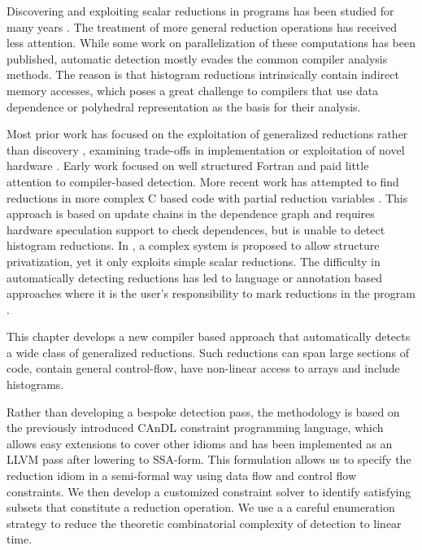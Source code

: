    Discovering and exploiting scalar reductions in programs has been
    studied for many years \cite{pottenger1995idiom}.
    The treatment of more general reduction operations has received less
    attention.
    While some work on parallelization of these computations has been published,
    automatic detection mostly evades the common compiler analysis methods.
    The reason is that histogram reductions intrinsically contain indirect
    memory accesses, which poses a great challenge to compilers that use
    data dependence \cite{kuck1981dependence} or polyhedral
    representation \cite{ benabderrahmane2010polyhedral} as the basis for
    their analysis.

    Most prior work has focused on the exploitation of generalized reductions
    rather than discovery \cite{Gutierrez:2000}, examining trade-offs in
    implementation \cite{yu2006adaptive} or exploitation of novel hardware
    \cite{Huo2011HiPC}.
    Early work focused on well structured Fortran and paid little attention to
    compiler-based detection.  More recent work has attempted to find
    reductions in more complex C based code with partial reduction
    variables \cite{Han2010Speculative}. This approach is  based on update
    chains in the dependence graph and requires hardware speculation support
    to check dependences, but is unable to detect histogram
    reductions. In \cite{Johnson:2012:SSP:2254064.2254107}, a complex system is
    proposed to allow structure privatization, yet it only exploits simple
    scalar reductions.  The difficulty in automatically detecting
    reductions has led to language or annotation based approaches where it
    is the user's responsibility to mark reductions in the
    program \cite{Reddy2016Reduction,ciesko2015scaling}.

    This chapter develops a new compiler based approach that
    automatically detects a wide class of generalized reductions. Such
    reductions can span large sections of code, contain general
    control-flow, have non-linear access to arrays and include histograms.

    Rather than developing a bespoke detection pass, the methodology is based on
    the previously introduced CAnDL constraint programming language, which
    allows easy extensions to cover other idioms and has been implemented as an
    LLVM \cite{lattner2004llvm} pass after lowering to SSA-form.  
    This formulation allows us to specify the reduction idiom in a semi-formal
    way using data flow and control flow constraints.
    We then develop a customized constraint solver to identify
    satisfying subsets that constitute a reduction operation.  We use a a careful
    enumeration strategy to reduce the theoretic combinatorial complexity
    of detection to  linear time.


